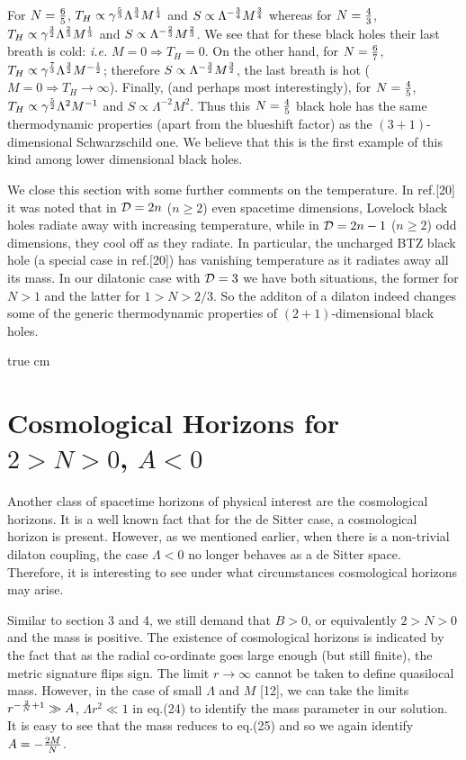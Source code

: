 For $N={6\over 5}$, $T_{H}\propto \gamma^{5\over 3}
\Lambda^{{3\over4}}M^{{1\over4}}$ and
$S\propto\Lambda^{-{3\over4}}M^{{3\over4}}$ whereas for $N={4\over 3}$,
$T_{H}\propto\gamma^{3\over 2}\Lambda^{{2\over3}}M^{{1\over3}}$ and
$S\propto\Lambda^{-{2\over3}}M^{{2\over 3}}$. We see that for these black
holes their last breath is cold: {\sl i.e.} $M=0\Rightarrow T_H=0$.
On the other hand, for $N={{6\over 7}}$,
$T_{H}\propto\gamma^{7\over 3}\Lambda^{{3\over 2}}M^{-{1\over 2}}$;
therefore $S\propto\Lambda^{-{3\over2}}M^{{3\over2}}$, the last breath is
hot ($M=0\Rightarrow T_H\to\infty$). Finally, (and perhaps most
interestingly), for $N={4\over5}$, $T_{H}\propto\gamma^{5\over
2}{{\Lambda}^2}M^{-1}$ and $S\propto\Lambda^{-2}M^2$. Thus this
$N={4\over5}$ black hole has the same thermodynamic properties
(apart from the blueshift factor) as the
$(3+1)$-dimensional Schwarzschild one. We believe that this is the first
example of this kind among lower dimensional black holes.

We close this section with some further comments on the temperature. In
ref.[20] it was noted that in ${\cal D}=2n$ ($n\geq 2$) even spacetime
dimensions, Lovelock black holes radiate away with increasing temperature,
while in ${\cal D}=2n-1$ ($n\geq 2$) odd dimensions, they cool off as they
radiate. In particular, the uncharged BTZ black hole (a special case in
ref.[20]) has vanishing temperature as it radiates away all its mass.
In our dilatonic case  with ${\cal D}=3$ we have both situations,
the former for $N>1$ and the latter for $1>N>2/3$. So the additon of a
dilaton indeed changes some of the generic thermodynamic properties of
$(2+1)$-dimensional black holes.

 true cm

\section{Cosmological Horizons for $2>N>0$, $A<0$}

Another class of spacetime horizons of physical interest are
the cosmological horizons. It is a well known fact that
for the de Sitter case, a cosmological horizon is present.
However, as we mentioned earlier, when there is a non-trivial
dilaton coupling, the case $\Lambda<0$  no longer behaves as a
de Sitter space. Therefore, it is interesting to see under
what circumstances cosmological horizons may arise.

Similar to section 3 and 4, we still demand that $B>0$, or equivalently
$2>N>0$ and the mass is positive.  The existence of cosmological horizons
is indicated by the fact that as the radial co-ordinate goes large enough
(but still finite), the metric signature flips sign. The limit $r\to\infty$
cannot be taken to define quasilocal mass. However, in the case of
small $\Lambda$ and $M$ [12], we can take the limits
$r^{-{2\over N}+1}\gg A$, $\Lambda r^2\ll 1$ in eq.(24) to identify the
mass parameter in our solution. It is easy to see that the mass reduces to
eq.(25) and so we again identify $A=-{2M\over N}$.

